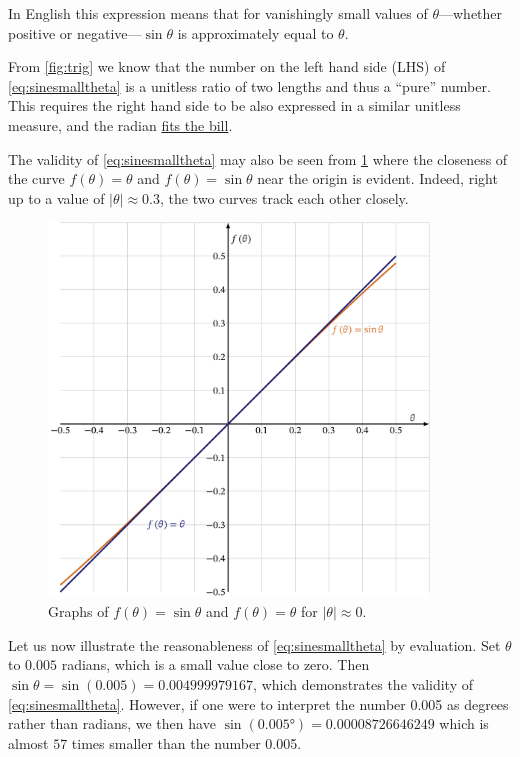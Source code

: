 \documentclass[
  a4paper,
]{article}
\begin{document}
In English this expression means that for vanishingly small values of
\(\theta\)---whether positive or negative---\(\sin\theta\) is
approximately equal to \(\theta\).

From \cref{fig:trig} we know that the number on the left hand side (LHS)
of \cref{eq:sinesmalltheta} is a unitless ratio of two lengths and thus
a ``pure'' number. This requires the right hand side to be also
expressed in a similar unitless measure, and the radian
\href{https://www.collinsdictionary.com/dictionary/english/fit-the-bill}{fits
the bill}.

The validity of \cref{eq:sinesmalltheta} may also be seen from
\cref{fig:xsinx} where the closeness of the curve \(f(\theta) = \theta\)
and \(f(\theta) = \sin\theta\) near the origin is evident. Indeed, right
up to a value of \(\lvert\theta\rvert\approx 0.3\), the two curves track
each other closely.

\begin{figure}
\hypertarget{fig:xsinx}{%
\centering
\includegraphics[width=0.9\textwidth,height=\textheight]{images/xsinx.png}
\caption{Graphs of \(f(\theta)= \sin\theta\) and \(f(\theta) = \theta\)
for \(\lvert\theta\rvert\approx 0\).}\label{fig:xsinx}
}
\end{figure}

Let us now illustrate the reasonableness of \cref{eq:sinesmalltheta} by
evaluation. Set \(\theta\) to \(0.005\) radians, which is a small value
close to zero. Then \(\sin\theta = \sin(0.005) = 0.004999979167\), which
demonstrates the validity of \cref{eq:sinesmalltheta}. However, if one
were to interpret the number 0.005 as degrees rather than radians, we
then have \(\sin(0.005°) = 0.00008726646249\) which is almost \(57\)
times smaller than the number 0.005.
\end{document}
